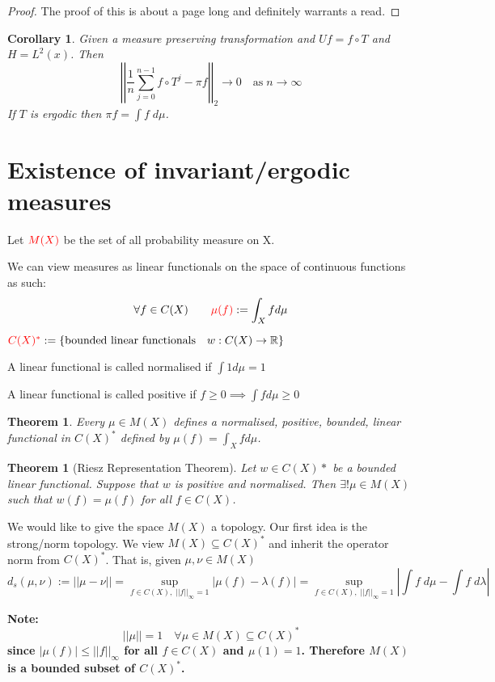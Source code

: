 \documentclass[11pt]{article}
\newcommand{\defeq}{:=}
\newcommand{\abs}[1]{\left|#1\right|}
\newcommand{\norm}[1]{\left|\left|#1\right|\right|}
\newcommand{\R}{\mathbb{R}}
\newenvironment{defin}
	{\begin{mdframed}[backgroundcolor=white, roundcorner=5pt, linewidth=1pt]}
	{\end{mdframed}}
\newcommand{\mdf}[1]{{\color{red} #1}}
\newenvironment{note}
	{\begin{mdframed}[backgroundcolor=white, linecolor=red, roundcorner=5pt, linewidth=1pt]\bfseries{Note:}\normalfont}
	{\end{mdframed}}
\newtheorem{theorem}[prop]{Theorem}
\newtheorem{cor}[prop]{Corollary}
\begin{document}
\begin{proof}
The proof of this is about a page long and definitely warrants a read.
\end{proof}

\begin{cor}
	Given a measure preserving transformation and $Uf=f\circ T$ and $H=L^2(x)$. Then
	\[
		\norm{\frac{1}{n}\sum_{j=0}^{n-1}f\circ T^j - \pi f}_2 \to 0 \quad \text{as} \; n\to\infty
	\]
	If $T$ is ergodic then $\pi f = \int f\; d\mu$.
\end{cor}

\section{Existence of invariant/ergodic measures}
\begin{defin}
Let $\mdf{M(X)}$ be the set of all probability measure on X.

We can view measures as linear functionals on the space of continuous functions as such:
$$\forall f\in C(X)\quad\quad \mdf{\mu(f)}\defeq\int_X f d\mu$$

$\mdf{C(X)^*}\defeq\{\text{bounded linear functionals}\quad w:C(X)\to\R\}$

A linear functional is called \mdf{normalised} if $\int 1 d\mu =1$

A linear functional is called \mdf{positive} if $f\geq 0\implies \int f d\mu \geq 0$
\end{defin}
\begin{theorem}
	Every $\mu\in M(X)$ defines a normalised, positive, bounded, linear functional in $C(X)^*$ defined by $\mu(f)=\int_X f d\mu$.
\end{theorem}
\begin{theorem}[Riesz Representation Theorem]
	Let $w\in C(X)*$ be a bounded linear functional. Suppose that $w$ is positive and normalised. Then $\exists !\mu\in M(X)$ such that $w(f)=\mu(f)$ for all $f\in C(X)$.
\end{theorem}

We would like to give the space $M(X)$ a topology.
Our first idea is the \mdf{strong/norm topology}.
We view $M(X) \subseteq C(X)^\ast$ and inherit the operator norm from $C(X)^\ast$.
That is, given $\mu, \nu \in M(X)$
\[
	d_s(\mu, \nu) \defeq \norm{\mu - \nu} = \sup_{f\in C(X) , \; \norm{f}_\infty=1}\abs{\mu(f)- \lambda(f)} = \sup_{f\in C(X) , \; \norm{f}_\infty=1} \abs{\int f \;d\mu - \int f \; d\lambda}
\]

\begin{note}
	\[
 		\norm{\mu} =1 \quad \forall \mu \in M(X) \subseteq C(X)^\ast
	\]
	since $\abs{\mu(f)}\leq\norm{f}_\infty$ for all $f\in C(X)$ and $\mu(1)=1$.
	Therefore $M(X)$ is a bounded subset of $C(X)^\ast$.
\end{note}
\end{document}
